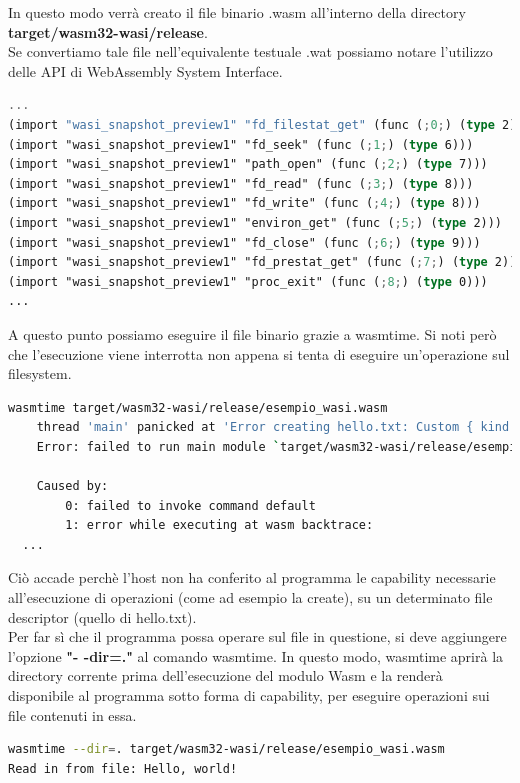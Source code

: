 In questo modo verrà creato il file binario .wasm all'interno della directory \textbf{target/wasm32-wasi/release}.
\\Se convertiamo tale file nell'equivalente testuale .wat possiamo notare l'utilizzo delle API di WebAssembly System Interface.
\begin{lstlisting}[language=rust, label=lst:RustWasi, caption={Le API importate di WASI}, showstringspaces=false, numbers=none]
...
(import "wasi_snapshot_preview1" "fd_filestat_get" (func (;0;) (type 2)))
(import "wasi_snapshot_preview1" "fd_seek" (func (;1;) (type 6)))
(import "wasi_snapshot_preview1" "path_open" (func (;2;) (type 7)))
(import "wasi_snapshot_preview1" "fd_read" (func (;3;) (type 8)))
(import "wasi_snapshot_preview1" "fd_write" (func (;4;) (type 8)))
(import "wasi_snapshot_preview1" "environ_get" (func (;5;) (type 2)))
(import "wasi_snapshot_preview1" "fd_close" (func (;6;) (type 9)))
(import "wasi_snapshot_preview1" "fd_prestat_get" (func (;7;) (type 2)))
(import "wasi_snapshot_preview1" "proc_exit" (func (;8;) (type 0)))
...
\end{lstlisting}
A questo punto possiamo eseguire il file binario grazie a wasmtime. Si noti però che l'esecuzione viene interrotta non appena si tenta di eseguire un'operazione sul filesystem.
\begin{lstlisting}[language=Bash, showstringspaces=false,numbers=none]
wasmtime target/wasm32-wasi/release/esempio_wasi.wasm
    thread 'main' panicked at 'Error creating hello.txt: Custom { kind: Uncategorized, error: "failed to find a pre-opened file descriptor through which \"hello.txt\" could be opened" }', src\main.rs:8:6
    Error: failed to run main module `target/wasm32-wasi/release/esempio_wasi.wasm`
    
    Caused by:
        0: failed to invoke command default
        1: error while executing at wasm backtrace:
  ...
\end{lstlisting}
Ciò accade perchè l'host non ha conferito al programma le capability necessarie all'esecuzione di operazioni (come ad esempio la create), su un determinato file descriptor (quello di hello.txt).
\\Per far sì che il programma possa operare sul file in questione, si deve aggiungere l'opzione \textbf{"- -dir=."} al comando wasmtime. In questo modo, wasmtime aprirà la directory corrente prima dell'esecuzione del modulo Wasm e la renderà disponibile al programma sotto forma di capability, per eseguire operazioni sui file contenuti in essa.
\begin{lstlisting}[language=Bash, showstringspaces=false, numbers=none]
wasmtime --dir=. target/wasm32-wasi/release/esempio_wasi.wasm
Read in from file: Hello, world!
\end{lstlisting}

